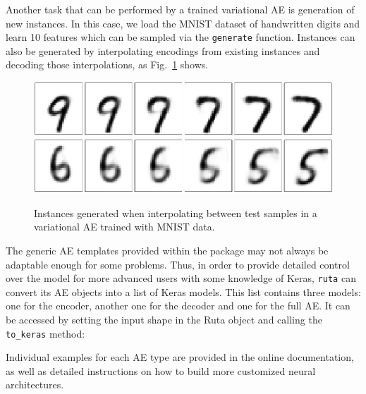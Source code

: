 \documentclass[
	fontsize=11pt, %
	twoside=false, %
	open=any, %
	secnumdepth=1, %
]{kaobook}
\newcommand{\revisedtwo}[1]{#1}
\begin{document}


Another task that can be performed by a trained variational AE is generation of new instances. In this case, we load the MNIST dataset of handwritten digits and learn 10 features which can be sampled via the \texttt{generate} function. Instances can also be generated by interpolating encodings from existing instances and decoding those interpolations, as Fig.~\ref{fig.variational} shows.




\begin{figure}[ht]
  \centering
  \includegraphics[width=0.8\columnwidth]{variational_97.pdf}
  \includegraphics[width=0.8\columnwidth]{variational_65.pdf}
  \caption{Instances generated when interpolating between test samples in a variational AE trained with MNIST data.}
  \label{fig.variational}
\end{figure}

\revisedtwo{The generic AE templates provided within the package may not always be adaptable enough for some problems. Thus, in order to provide detailed control over the model for more advanced users with some knowledge of Keras, \texttt{ruta} can convert its AE objects into a list of Keras models. This list contains three models: one for the encoder, another one for the decoder and one for the full AE. It can be accessed by setting the input shape in the Ruta object and calling the \texttt{to\_keras} method:}



Individual examples for each AE type are provided in the online documentation, as well as detailed instructions on how to build more customized neural architectures.

%

\end{document}
